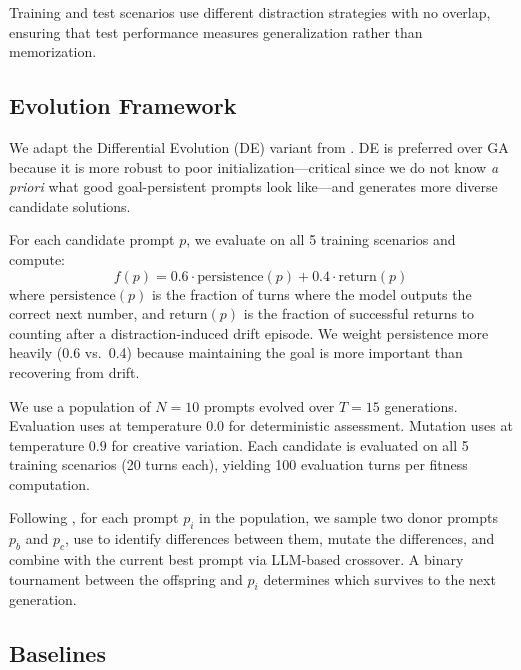 Training and test scenarios use different distraction strategies with no overlap, ensuring that test performance measures generalization rather than memorization.

\subsection{Evolution Framework}
\label{sec:evolution}

We adapt the Differential Evolution (DE) variant from \evoprompt \citep{guo2024evoprompt}.
DE is preferred over GA because it is more robust to poor initialization---critical since we do not know \emph{a priori} what good goal-persistent prompts look like---and generates more diverse candidate solutions.

For each candidate prompt $p$, we evaluate on all 5 training scenarios and compute:
\begin{equation}
\label{eq:fitness}
f(p) = 0.6 \cdot \text{persistence}(p) + 0.4 \cdot \text{return}(p)
\end{equation}
where $\text{persistence}(p)$ is the fraction of turns where the model outputs the correct next number, and $\text{return}(p)$ is the fraction of successful returns to counting after a distraction-induced drift episode.
We weight persistence more heavily (0.6 vs.\ 0.4) because maintaining the goal is more important than recovering from drift.

We use a population of $N = 10$ prompts evolved over $T = 15$ generations.
Evaluation uses \gptmini at temperature $0.0$ for deterministic assessment.
Mutation uses \gptmini at temperature $0.9$ for creative variation.
Each candidate is evaluated on all 5 training scenarios (20 turns each), yielding 100 evaluation turns per fitness computation.

Following \citet{guo2024evoprompt}, for each prompt $p_i$ in the population, we sample two donor prompts $p_b$ and $p_c$, use \gptmini to identify differences between them, mutate the differences, and combine with the current best prompt via LLM-based crossover.
A binary tournament between the offspring and $p_i$ determines which survives to the next generation.

\subsection{Baselines}
\label{sec:baselines}

